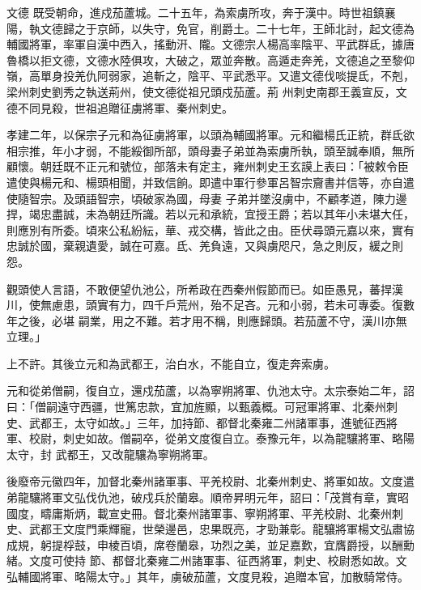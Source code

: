 \begin{pinyinscope}
 文德
 既受朝命，進戍茄蘆城。二十五年，為索虜所攻，奔于漢中。時世祖鎮襄陽，執文德歸之于京師，以失守，免官，削爵土。二十七年，王師北討，起文德為輔國將軍，率軍自漢中西入，搖動汧、隴。文德宗人楊高率陰平、平武群氐，據唐魯橋以拒文德，文德水陸俱攻，大破之，眾並奔散。高遁走奔羌，文德追之至黎仰嶺，高單身投羌仇阿弱家，追斬之，陰平、平武悉平。又遣文德伐啖提氐，不剋，梁州刺史劉秀之執送荊州，使文德從祖兄頭戍茄蘆。荊
 州刺史南郡王義宣反，文德不同見殺，世祖追贈征虜將軍、秦州刺史。



 孝建二年，以保宗子元和為征虜將軍，以頭為輔國將軍。元和繼楊氏正統，群氐欲相宗推，年小才弱，不能綏御所部，頭母妻子弟並為索虜所執，頭至誠奉順，無所顧懷。朝廷既不正元和號位，部落未有定主，雍州刺史王玄謨上表曰：「被敕令臣遣使與楊元和、楊頭相聞，并致信餉。即遣中軍行參軍呂智宗齎書并信等，亦自遣使隨智宗。及頭語智宗，頃破家為國，母妻
 子弟并墜沒虜中，不顧孝道，陳力邊捍，竭忠盡誠，未為朝廷所識。若以元和承統，宜授王爵；若以其年小未堪大任，則應別有所委。頃來公私紛紜，華、戎交構，皆此之由。臣伏尋頭元嘉以來，實有忠誠於國，棄親遺愛，誠在可嘉。氐、羌負遠，又與虜咫尺，急之則反，緩之則怨。



 觀頭使人言語，不敢便望仇池公，所希政在西秦州假節而已。如臣愚見，蕃捍漢川，使無慮患，頭實有力，四千戶荒州，殆不足吝。元和小弱，若未可專委。復數年之後，必堪
 嗣業，用之不難。若才用不稱，則應歸頭。若茄蘆不守，漢川亦無立理。」



 上不許。其後立元和為武都王，治白水，不能自立，復走奔索虜。



 元和從弟僧嗣，復自立，還戍茄蘆，以為寧朔將軍、仇池太守。太宗泰始二年，詔曰：「僧嗣遠守西疆，世篤忠款，宜加旌顯，以甄義概。可冠軍將軍、北秦州刺史、武都王，太守如故。」三年，加持節、都督北秦雍二州諸軍事，進號征西將軍、校尉，刺史如故。僧嗣卒，從弟文度復自立。泰豫元年，以為龍驤將軍、略陽太守，封
 武都王，又改龍驤為寧朔將軍。



 後廢帝元徽四年，加督北秦州諸軍事、平羌校尉、北秦州刺史、將軍如故。文度遣弟龍驤將軍文弘伐仇池，破戍兵於蘭皋。順帝昇明元年，詔曰：「茂賞有章，實昭國度，疇庸斯炳，載宣史冊。督北秦州諸軍事、寧朔將軍、平羌校尉、北秦州刺史、武都王文度門乘輝寵，世榮邊邑，忠果既亮，才勁兼彰。龍驤將軍楊文弘肅協成規，躬提桴鼓，申棱百頃，席卷蘭皋，功烈之美，並足嘉歎，宜膺爵授，以酬勳緒。文度可使持
 節、都督北秦雍二州諸軍事、征西將軍，刺史、校尉悉如故。文弘輔國將軍、略陽太守。」其年，虜破茄蘆，文度見殺，追贈本官，加散騎常侍。




\end{pinyinscope}
